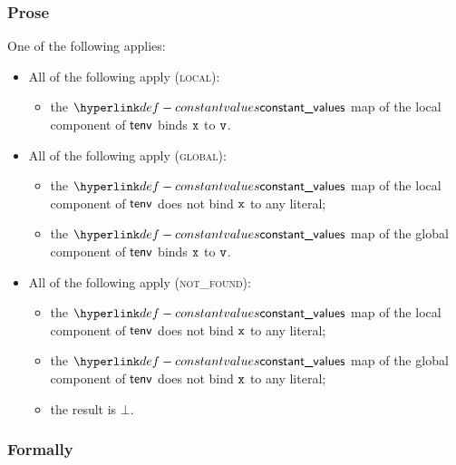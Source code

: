 \subsubsection{Prose}
One of the following applies:
\begin{itemize}
  \item All of the following apply (\textsc{local}):
  \begin{itemize}
    \item the $\constantvalues$ map of the local component of $\tenv$ binds $\vx$ to $\vv$.
  \end{itemize}

  \item All of the following apply (\textsc{global}):
  \begin{itemize}
    \item the $\constantvalues$ map of the local component of $\tenv$ does not bind $\vx$ to any literal;
    \item the $\constantvalues$ map of the global component of $\tenv$ binds $\vx$ to $\vv$.
  \end{itemize}

  \item All of the following apply (\textsc{not\_found}):
  \begin{itemize}
    \item the $\constantvalues$ map of the local component of $\tenv$ does not bind $\vx$ to any literal;
    \item the $\constantvalues$ map of the global component of $\tenv$ does not bind $\vx$ to any literal;
    \item the result is $\bot$.
  \end{itemize}
\end{itemize}
\subsubsection{Formally}
\begin{mathpar}
\end{mathpar}

\begin{mathpar}
\end{mathpar}

\begin{mathpar}
\end{mathpar}

